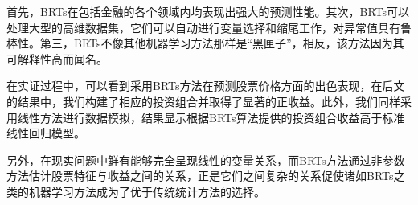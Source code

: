 首先，BRTs在包括金融的各个领域内均表现出强大的预测性能。其次，BRTs可以处理大型的高维数据集，它们可以自动进行变量选择和缩尾工作，对异常值具有鲁棒性。第三，BRTs不像其他机器学习方法那样是“黑匣子”，相反，该方法因为其可解释性高而闻名。

在实证过程中，可以看到采用BRTs方法在预测股票价格方面的出色表现，在后文的结果中，我们构建了相应的投资组合并取得了显著的正收益。此外，我们同样采用线性方法进行数据模拟，结果显示根据BRTs算法提供的投资组合收益高于标准线性回归模型。

另外，在现实问题中鲜有能够完全呈现线性的变量关系，而BRTs方法通过非参数方法估计股票特征与收益之间的关系，正是它们之间复杂的关系促使诸如BRTs之类的机器学习方法成为了优于传统统计方法的选择。

%
%
%
%
